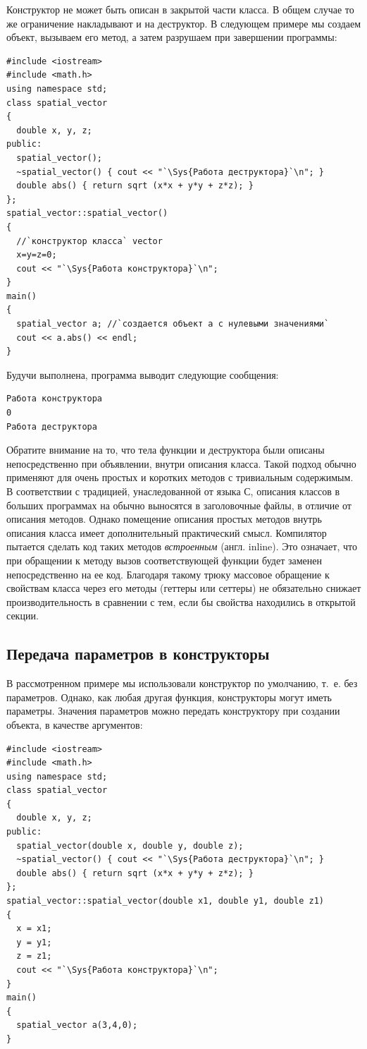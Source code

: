 Конструктор не может быть описан в закрытой части класса. В общем случае то же ограничение накладывают и на деструктор.
В следующем примере мы создаем объект, вызываем его метод, а затем разрушаем при завершении программы:
\begin{lstlisting}
#include <iostream>
#include <math.h>
using namespace std;
class spatial_vector 
{
  double x, y, z;
public:
  spatial_vector();
  ~spatial_vector() { cout << "`\Sys{Работа деструктора}`\n"; }
  double abs() { return sqrt (x*x + y*y + z*z); }
};
spatial_vector::spatial_vector() 
{
  //`конструктор класса` vector
  x=y=z=0;
  cout << "`\Sys{Работа конструктора}`\n";
}
main() 
{
  spatial_vector a; //`создается объект a с нулевыми значениями`
  cout << a.abs() << endl;
}
\end{lstlisting}

Будучи выполнена, программа выводит следующие сообщения:
\begin{verbatim}
Работа конструктора 
0 
Работа деструктора
\end{verbatim}

Обратите внимание на то, что тела функции  и деструктора были описаны непосредственно при
объявлении, внутри описания класса. Такой подход обычно применяют для очень простых и коротких методов с тривиальным
содержимым. В соответствии с традицией, унаследованной от языка С, описания классов в больших программах на  обычно
выносятся в заголовочные файлы, в отличие от описания методов. Однако помещение описания простых методов внутрь
описания класса имеет дополнительный практический смысл. Компилятор пытается сделать код таких методов
\emph{встроенным} (англ. inline). Это означает, что при обращении к методу вызов соответствующей функции
будет заменен непосредственно на ее код. Благодаря такому трюку массовое обращение к свойствам класса через его методы
(геттеры или сеттеры) не обязательно снижает производительность в сравнении с тем, если бы свойства находились в
открытой секции.

\subsection[Передача параметров в конструкторы]{Передача параметров в конструкторы}
В рассмотренном примере мы использовали конструктор по умолчанию, т.~е. без параметров. Однако, как любая другая
функция, конструкторы могут иметь параметры. Значения параметров можно передать конструктору при создании объекта, в
качестве аргументов:
\begin{lstlisting}
#include <iostream>
#include <math.h>
using namespace std;
class spatial_vector 
{
  double x, y, z;
public:
  spatial_vector(double x, double y, double z);
  ~spatial_vector() { cout << "`\Sys{Работа деструктора}`\n"; }
  double abs() { return sqrt (x*x + y*y + z*z); }
};
spatial_vector::spatial_vector(double x1, double y1, double z1) 
{
  x = x1;
  y = y1;
  z = z1;
  cout << "`\Sys{Работа конструктора}`\n";
}
main() 
{
  spatial_vector a(3,4,0);
}
\end{lstlisting}

